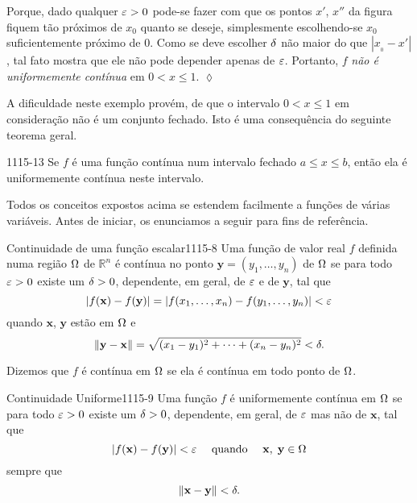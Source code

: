Porque, dado qualquer $\varepsilon > 0$ pode-se fazer com que os pontos $x'$, $x''$ da figura 
fiquem tão próximos de $x_{0}$ quanto se deseje, simplesmente escolhendo-se 
$x_{0}$ suficientemente próximo de $0$. Como se deve escolher $\delta$ não maior do 
que $|x_{_{0}}- x'|$, tal fato mostra que ele não pode depender apenas de $\varepsilon$. 
Portanto, $f$ \textit{não é uniformemente contínua} em $0 < x \le 1$. \hfill \(\lozenge\)

\bigskip
 A dificuldade neste exemplo provém, de que o intervalo $0 < x \le 1$ em consideração 
 não é um conjunto fechado. Isto é uma consequência do seguinte teorema geral.

\begin{theoc}{}{1115-13}
Se $f$ é uma função contínua num intervalo fechado $a \le x \le b$, então ela é 
uniformemente contínua neste intervalo.
\end{theoc}

Todos os conceitos expostos acima se estendem facilmente a funções de várias 
variáveis. Antes de iniciar, os enunciamos a seguir para fins de referência.

\begin{defic}{Continuidade de uma função escalar}{1115-8}
Uma função de valor real $f$ definida numa região $\Omega$ de $\mathbb{R}^n$ é contínua 
no ponto $\mathbf{y} = (y_1,\ldots, y_n)$ de $\Omega$ se para todo $\varepsilon> 0$ existe 
um $\delta> 0$, dependente, em geral, de $\varepsilon$ e de
$\mathbf{y}$, tal que
\begin{equation*}
  |f(\mathbf{x}) - f(\mathbf{y})| = |f(x_1,\ldots, x_n)-f(y_1,\ldots, y_n) | < \varepsilon
\end{equation*}
quando $\mathbf{x}$, $\mathbf{y}$ estão em $\Omega$  e
\begin{equation*}
  \|\mathbf{y}-\mathbf{x}\|= \sqrt{(x_1-y_1)^2+\cdots+(x_n-y_n)^2} <\delta.
\end{equation*}

Dizemos que $f$ é contínua em $\Omega$ se ela é contínua em todo ponto de $\Omega$.
\end{defic}

\begin{defic}{Continuidade Uniforme}{1115-9} 
Uma função $f$ é uniformemente contínua em $\Omega$  se para 
todo $\varepsilon >0$ existe um $\delta > 0$, dependente, em geral, de $\varepsilon$ mas não 
de $\mathbf{x}$, tal que
\begin{equation*}
  |f(\mathbf{x})-f(\mathbf{y}) |< \varepsilon \quad \text{ quando } 
  \quad \mathbf{x}, \; \mathbf{y} \in \Omega
\end{equation*}
sempre que
\begin{equation*}
  \|\mathbf{x}-\mathbf{y}\|<\delta.
\end{equation*}
\end{defic}

